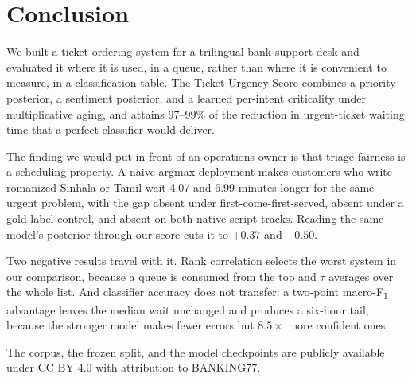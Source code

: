 \section{Conclusion}
\label{sec:conclusion}

We built a ticket ordering system for a trilingual bank support desk and
evaluated it where it is used, in a queue, rather than where it is convenient to
measure, in a classification table. The Ticket Urgency Score combines a priority
posterior, a sentiment posterior, and a learned per-intent criticality under
multiplicative aging, and attains 97--99\% of the reduction in urgent-ticket
waiting time that a perfect classifier would deliver.

The finding we would put in front of an operations owner is that triage fairness
is a scheduling property. A naive argmax deployment makes customers who write
romanized Sinhala or Tamil wait 4.07 and 6.99 minutes longer for the same urgent
problem, with the gap absent under first-come-first-served, absent under a
gold-label control, and absent on both native-script tracks. Reading the same
model's posterior through our score cuts it to $+0.37$ and $+0.50$.

Two negative results travel with it. Rank correlation selects the worst system
in our comparison, because a queue is consumed from the top and $\tau$ averages
over the whole list. And classifier accuracy does not transfer: a two-point
macro-F\textsubscript{1} advantage leaves the median wait unchanged and produces
a six-hour tail, because the stronger model makes fewer errors but
$8.5\times$ more confident ones.

The corpus, the frozen split, and the model checkpoints are publicly available
under CC BY 4.0 with attribution to BANKING77.
\ifblind\relax{}\fi
